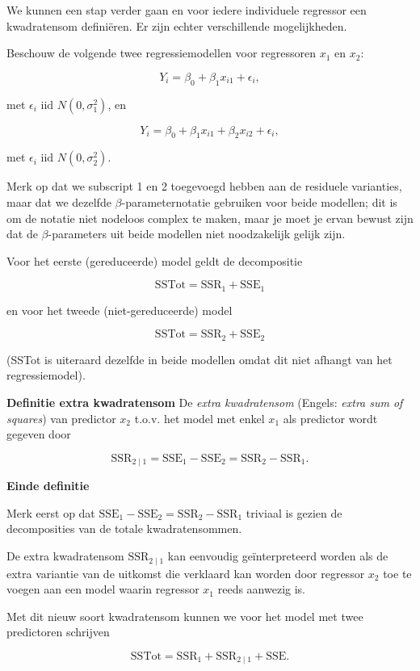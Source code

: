 \documentclass[
  12pt,dutch,coursenotes]{book}
\begin{document}
We kunnen een stap verder gaan en voor iedere individuele regressor een kwadratensom definiëren. Er zijn echter verschillende mogelijkheden.

Beschouw de volgende twee regressiemodellen voor regressoren \(x_1\) en \(x_2\):

\[
  Y_i = \beta_0+\beta_1 x_{i1} + \epsilon_i,
\]

met \(\epsilon_i\text{ iid } N(0,\sigma_1^{2})\), en

\[
Y_i = \beta_0+\beta_1 x_{i1}+\beta_2 x_{i2} + \epsilon_i,
\]

met \(\epsilon_i\text{ iid } N(0,\sigma_2^{2})\).

Merk op dat we subscript 1 en 2 toegevoegd hebben aan de residuele varianties, maar dat we dezelfde \(\beta\)-parameternotatie gebruiken voor beide modellen; dit is om de notatie niet nodeloos complex te maken, maar je moet je ervan bewust zijn dat de \(\beta\)-parameters uit beide modellen niet noodzakelijk gelijk zijn.

Voor het eerste (gereduceerde) model geldt de decompositie

\[
  \text{SSTot} = \text{SSR}_1 + \text{SSE}_1
\]

en voor het tweede (niet-gereduceerde) model

\[
  \text{SSTot} = \text{SSR}_2 + \text{SSE}_2
\]

(SSTot is uiteraard dezelfde in beide modellen omdat dit niet afhangt van het regressiemodel).

\textbf{Definitie extra kwadratensom}
De \emph{extra kwadratensom} (Engels: \emph{extra sum of squares}) van predictor \(x_2\) t.o.v. het model met enkel \(x_1\) als predictor wordt gegeven door

\[
  \text{SSR}_{2\mid 1} = \text{SSE}_1-\text{SSE}_2=\text{SSR}_2-\text{SSR}_1.
\]

\textbf{Einde definitie}

Merk eerst op dat \(\text{SSE}_1-\text{SSE}_2=\text{SSR}_2-\text{SSR}_1\) triviaal is gezien de decomposities van de totale kwadratensommen.

De extra kwadratensom \(\text{SSR}_{2\mid 1}\) kan eenvoudig geïnterpreteerd worden als de extra variantie van de uitkomst die verklaard kan worden door regressor \(x_2\) toe te voegen aan een model waarin regressor \(x_1\) reeds aanwezig is.

Met dit nieuw soort kwadratensom kunnen we voor het model met twee predictoren schrijven

\[
  \text{SSTot} = \text{SSR}_1+ \text{SSR}_{2\mid 1} + \text{SSE}.
\]
\end{document}
